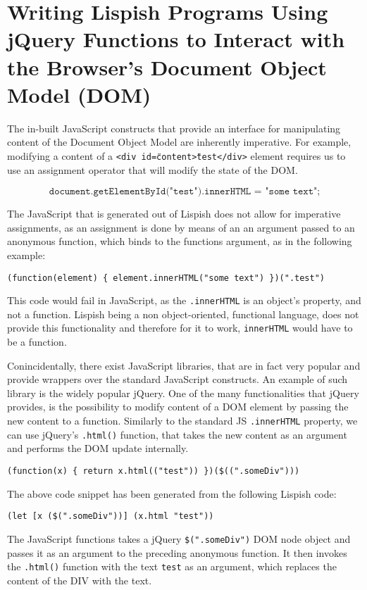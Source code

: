 \section{Writing Lispish Programs Using jQuery Functions to Interact with the Browser's Document Object Model (DOM)}\label{DOM}
The in-built JavaScript constructs that provide an interface for manipulating content of the Document Object Model are inherently imperative.
For example, modifying a content of a \texttt{<div id=\"content\">test</div>} element requires us to use an assignment operator that will modify the state of the DOM. 

$$ \texttt{document.getElementById("test").innerHTML = "some text";} $$


The JavaScript that is generated out of Lispish does not allow for imperative assignments, as an assignment is done by means of an an argument passed to an anonymous function, which binds to the functions argument, as in the following 
example:  

\begin{verbatim}
(function(element) { element.innerHTML("some text") })(".test")
\end{verbatim}


This code would fail in JavaScript, as the \texttt{.innerHTML} is an object's property, and not a function. Lispish being a non object-oriented, functional language, does not provide this functionality and therefore for it to work, \texttt{innerHTML} would have to be a function.

Conincidentally, there exist JavaScript libraries, that are in fact very popular and provide wrappers over the standard JavaScript constructs.
An example of such library is the widely popular jQuery\cite{jquery}. 
One of the many functionalities that jQuery provides, is the possibility to modify content of a DOM element by passing the new content to a function.
Similarly to the standard JS \texttt{.innerHTML} property, we can use jQuery's \texttt{.html()} function, that takes the new content as an argument and performs the DOM update internally. 

\begin{verbatim}
(function(x) { return x.html(("test")) })($((".someDiv")))
\end{verbatim}

The above code snippet has been generated from the following Lispish code:

\begin{verbatim}
(let [x ($(".someDiv"))] (x.html "test"))
\end{verbatim}

The JavaScript functions takes a jQuery \texttt{\$(".someDiv")} DOM node object and passes it as an argument to the preceding anonymous function.
It then invokes the \texttt{.html()} function with the text \texttt{test} as an argument, which replaces the content of the DIV with the text.

